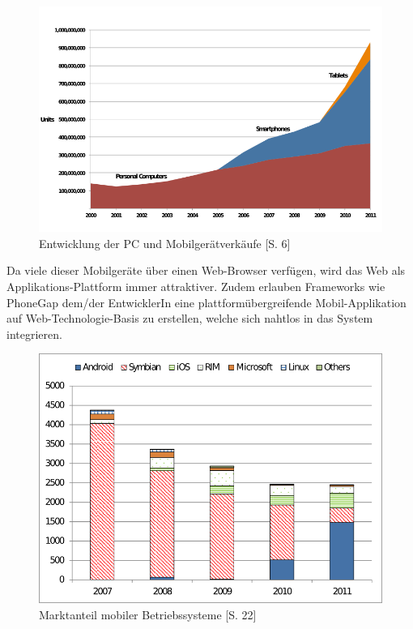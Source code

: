\documentclass[a4paper,bibtotoc,oneside]{scrbook}
\begin{document}
\begin{figure}[h!]
\centering
\includegraphics[width=150mm]{img/globaldevicesales.png}
\caption[Entwicklung der PC und Mobilgerätverkäufe]{Entwicklung der PC und Mobilgerätverkäufe \cite{devicesales}[S. 6]}\label{Abb1}
\end{figure}

Da viele dieser Mobilgeräte über einen Web-Browser verfügen, wird das Web als Applikations-Plattform immer attraktiver. Zudem erlauben Frameworks wie PhoneGap \cite{phonegap} dem/der EntwicklerIn eine plattformübergreifende Mobil-Applikation auf Web-Technologie-Basis zu erstellen, welche sich nahtlos in das System integrieren. 

\begin{figure}[h!]
\centering
\includegraphics[width=130mm]{img/operatingsystems.png}
\caption[Marktanteil mobiler Betriebssysteme]{Marktanteil mobiler Betriebssysteme \cite{smartphone}[S. 22]}\label{Abb2}
\end{figure}
\end{document}
